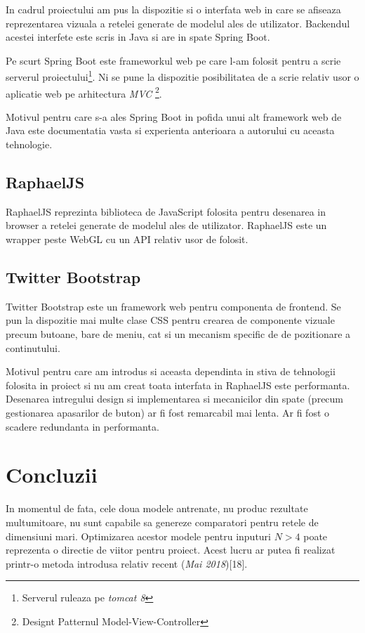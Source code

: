\documentclass[12pt]{article}
\begin{document}
In cadrul proiectului am pus la dispozitie si o interfata web in care se afiseaza reprezentarea vizuala a retelei generate de modelul ales de utilizator. Backendul acestei interfete este scris in Java si are in spate Spring Boot.

Pe scurt Spring Boot este frameworkul web pe care l-am folosit pentru a scrie serverul proiectului\footnote{Serverul ruleaza pe \textit{tomcat 8}}. Ni se pune la dispozitie posibilitatea de a scrie relativ usor o aplicatie web pe arhitectura \textit{MVC} \footnote{Designt Patternul Model-View-Controller}. 

Motivul pentru care s-a ales Spring Boot in pofida unui alt framework web de Java este documentatia vasta si experienta anterioara a autorului cu aceasta tehnologie.

\subsection{RaphaelJS}

RaphaelJS reprezinta biblioteca de JavaScript folosita pentru desenarea in browser a retelei generate de modelul ales de utilizator. RaphaelJS este un wrapper peste WebGL cu un API relativ usor de folosit.


\subsection{Twitter Bootstrap}

Twitter Bootstrap este un framework web pentru componenta de frontend. Se pun la dispozitie mai multe clase CSS pentru crearea de componente vizuale precum butoane, bare de meniu, cat si un mecanism specific de de pozitionare a continutului.

Motivul pentru care am introdus si aceasta dependinta in stiva de tehnologii folosita in proiect si nu am creat toata interfata in RaphaelJS este performanta. Desenarea intregului design si implementarea si mecanicilor din spate (precum gestionarea apasarilor de buton) ar fi fost remarcabil mai lenta. Ar fi fost o scadere redundanta in performanta.

\pagebreak

\section{Concluzii}

 In momentul de fata, cele doua modele antrenate, nu produc rezultate multumitoare, nu sunt capabile sa genereze comparatori pentru retele de dimensiuni mari. Optimizarea acestor modele pentru inputuri $N>4$ poate reprezenta o directie de viitor pentru proiect. Acest lucru ar putea fi realizat printr-o metoda introdusa relativ recent (\textit{Mai 2018})[18].
\end{document}
